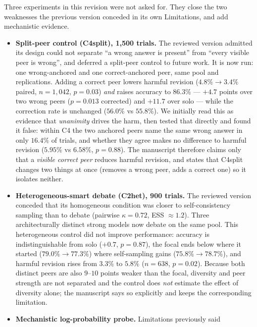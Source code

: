 \documentclass[11pt]{article}
\begin{document}
Three experiments in this revision were not asked for. They close the two
weaknesses the previous version conceded in its own Limitations, and add
mechanistic evidence.

\begin{itemize}\itemsep3pt
  \item \textbf{Split-peer control (C4split), 1{,}500 trials.} The reviewed
        version admitted its design could not separate ``a wrong answer is
        present'' from ``every visible peer is wrong'', and deferred a
        split-peer control to future work. It is now run: one wrong-anchored
        and one correct-anchored peer, same pool and replications. Adding a correct
        peer lowers harmful revision ($4.8\%\to3.4\%$ paired, $n=1{,}042$,
        $p=0.03$) \emph{and} raises accuracy to $86.3\%$ --- $+4.7$ points over
        two wrong peers ($p=0.013$ corrected) and $+11.7$ over solo --- while
        the correction rate is unchanged ($56.0\%$ vs $55.8\%$).
        We initially read this as evidence that \emph{unanimity} drives the
        harm, then tested that directly and found it false: within C4 the two
        anchored peers name the same wrong answer in only $16.4\%$ of trials,
        and whether they agree makes no difference to harmful revision
        ($5.95\%$ vs $6.58\%$, $p=0.88$). The manuscript therefore claims only
        that a \emph{visible correct peer} reduces harmful revision, and states
        that C4split changes two things at once (removes a wrong peer, adds a
        correct one) so it isolates neither.
  \item \textbf{Heterogeneous-smart debate (C2het), 900 trials.} The reviewed
        version conceded that its homogeneous condition was closer to
        self-consistency sampling than to debate (pairwise $\kappa=0.72$,
        ESS $\approx1.2$). Three architecturally distinct strong models now
        debate on the same pool. This heterogeneous control did not improve
        performance: accuracy is indistinguishable from solo ($+0.7$,
        $p=0.87$), the focal ends below where it started
        ($79.0\%\to77.3\%$) where self-sampling gains ($75.8\%\to78.7\%$), and
        harmful revision rises from $3.3\%$ to $5.8\%$ ($n=638$, $p=0.02$).
        Because both distinct peers are also $9$--$10$ points weaker than the
        focal, diversity and peer strength are not separated and the control
        does \emph{not} estimate the effect of diversity alone; the manuscript
        says so explicitly and keeps the corresponding limitation.
  \item \textbf{Mechanistic log-probability probe.} Limitations previously said

\end{itemize}
\end{document}
